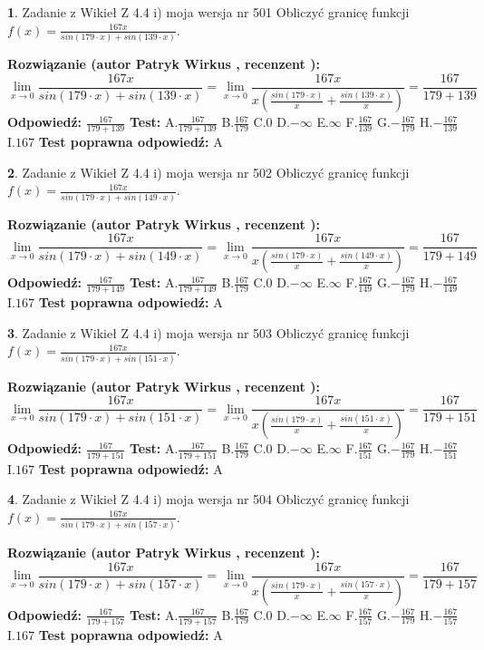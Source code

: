 \documentclass[12pt, a4paper]{article}
\theoremstyle{definition} %
\newtheorem{zad}{}
\newcommand{\zadStart}[1]{\begin{zad}#1\newline}
\newcommand{\zadStop}{\end{zad}}
\newcommand{\rozwStart}[2]{\noindent \textbf{Rozwiązanie (autor #1 , recenzent #2): }\newline}
\newcommand{\rozwStop}{\newline}
\newcommand{\odpStart}{\noindent \textbf{Odpowiedź:}\newline}
\newcommand{\odpStop}{\newline}
\newcommand{\testStart}{\noindent \textbf{Test:}\newline}
\newcommand{\testStop}{\newline}
\newcommand{\kluczStart}{\noindent \textbf{Test poprawna odpowiedź:}\newline}
\newcommand{\kluczStop}{\newline}
\begin{document}
\zadStart{Zadanie z Wikieł Z 4.4 i) moja wersja nr 501}
Obliczyć granicę funkcji $f(x)=\frac{167x}{sin(179\cdot x) +sin(139\cdot x)}$.
\zadStop
\rozwStart{Patryk Wirkus}{}
$$\lim\limits_{x\to 0}\frac{167x}{sin(179\cdot x) +sin(139\cdot x)}=\lim\limits_{x\to 0}\frac{167x}{x(\frac{sin(179\cdot x)}{x}+\frac{sin(139\cdot x)}{x})}=\frac{167}{179+139}$$
\rozwStop
\odpStart
$\frac{167}{179+139}$
\odpStop
\testStart
A.$\frac{167}{179+139}$
B.$\frac{167}{179}$
C.$0$
D.$-\infty$
E.$\infty$
F.$\frac{167}{139}$
G.$-\frac{167}{179}$
H.$-\frac{167}{139}$
I.$167$
\testStop
\kluczStart
A
\kluczStop



\zadStart{Zadanie z Wikieł Z 4.4 i) moja wersja nr 502}
Obliczyć granicę funkcji $f(x)=\frac{167x}{sin(179\cdot x) +sin(149\cdot x)}$.
\zadStop
\rozwStart{Patryk Wirkus}{}
$$\lim\limits_{x\to 0}\frac{167x}{sin(179\cdot x) +sin(149\cdot x)}=\lim\limits_{x\to 0}\frac{167x}{x(\frac{sin(179\cdot x)}{x}+\frac{sin(149\cdot x)}{x})}=\frac{167}{179+149}$$
\rozwStop
\odpStart
$\frac{167}{179+149}$
\odpStop
\testStart
A.$\frac{167}{179+149}$
B.$\frac{167}{179}$
C.$0$
D.$-\infty$
E.$\infty$
F.$\frac{167}{149}$
G.$-\frac{167}{179}$
H.$-\frac{167}{149}$
I.$167$
\testStop
\kluczStart
A
\kluczStop



\zadStart{Zadanie z Wikieł Z 4.4 i) moja wersja nr 503}
Obliczyć granicę funkcji $f(x)=\frac{167x}{sin(179\cdot x) +sin(151\cdot x)}$.
\zadStop
\rozwStart{Patryk Wirkus}{}
$$\lim\limits_{x\to 0}\frac{167x}{sin(179\cdot x) +sin(151\cdot x)}=\lim\limits_{x\to 0}\frac{167x}{x(\frac{sin(179\cdot x)}{x}+\frac{sin(151\cdot x)}{x})}=\frac{167}{179+151}$$
\rozwStop
\odpStart
$\frac{167}{179+151}$
\odpStop
\testStart
A.$\frac{167}{179+151}$
B.$\frac{167}{179}$
C.$0$
D.$-\infty$
E.$\infty$
F.$\frac{167}{151}$
G.$-\frac{167}{179}$
H.$-\frac{167}{151}$
I.$167$
\testStop
\kluczStart
A
\kluczStop



\zadStart{Zadanie z Wikieł Z 4.4 i) moja wersja nr 504}
Obliczyć granicę funkcji $f(x)=\frac{167x}{sin(179\cdot x) +sin(157\cdot x)}$.
\zadStop
\rozwStart{Patryk Wirkus}{}
$$\lim\limits_{x\to 0}\frac{167x}{sin(179\cdot x) +sin(157\cdot x)}=\lim\limits_{x\to 0}\frac{167x}{x(\frac{sin(179\cdot x)}{x}+\frac{sin(157\cdot x)}{x})}=\frac{167}{179+157}$$
\rozwStop
\odpStart
$\frac{167}{179+157}$
\odpStop
\testStart
A.$\frac{167}{179+157}$
B.$\frac{167}{179}$
C.$0$
D.$-\infty$
E.$\infty$
F.$\frac{167}{157}$
G.$-\frac{167}{179}$
H.$-\frac{167}{157}$
I.$167$
\testStop
\kluczStart
A
\kluczStop
\end{document}
